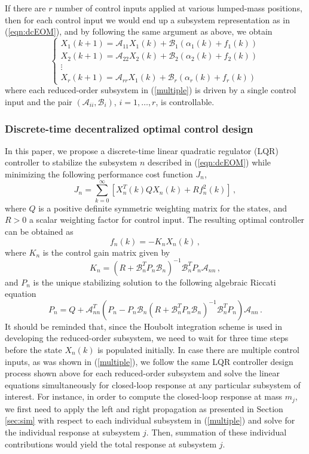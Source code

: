 \documentclass[11pt]{ucthesis}
\newcommand{\beq}{\begin{equation}}
\newcommand{\eeq}{\end{equation}}
\begin{document}
If there are $r$ number of control inputs applied at various lumped-mass positions, then for each control input we would end up a subsystem representation as in (\ref{eqn:dcEOM}), and by following the same argument as above, we obtain 
\beq		\label{multiple}
\left \{
\begin{array}{l}
X_1(k+1) = \mathcal{A}_{11} X_1(k) + \mathcal{B}_1 (\alpha_1 (k) +f_{1} (k) )  \\
X_2(k+1) = \mathcal{A}_{22} X_2(k) + \mathcal{B}_2 (\alpha_2 (k) +f_{2} (k) )  \\
\vdots \\
X_r (k+1) = \mathcal{A}_{rr} X_1(k) + \mathcal{B}_r (\alpha_r (k) +f_{r} (k) ) 
\end{array}
\right .
\eeq
where each reduced-order subsystem in (\ref{multiple}) is driven by a single control input and the pair $(\mathcal{A}_{ii}, \mathcal{B}_i)$, $i = 1,\dots,r$, is controllable. 

\subsubsection{Discrete-time decentralized optimal control design}	\label{dcontrol}

In this paper, we propose a discrete-time linear quadratic regulator (LQR) controller to stabilize the subsystem $n$ described in (\ref{eqn:dcEOM}) while minimizing the following performance cost function $J_n$,
\beq		\label{lqr1}
J_n = \sum_{k=0}^{\infty} \left [ X_{n}^{T} (k) Q X_{n}(k) + R f^{2}_{n} (k) \right ]\,,
\eeq
where $Q$ is a positive definite symmetric weighting matrix for the states, and $R>0$ a scalar weighting factor for control input. The resulting optimal controller can be obtained as
\beq		\label{lqr2}
f_n (k) = - K_n X_n (k) \,,
\eeq
where $K_n$ is the control gain matrix given by
\beq		\label{lqr3}
K_n = (R+\mathcal{B}_n^{T} P_n \mathcal{B}_n)^{-1} \mathcal{B}_n^{T} P_n \mathcal{A}_{nn} \,,
\eeq
and $P_n$ is the unique stabilizing solution to the following algebraic Riccati equation
\[
P_n = Q + \mathcal{A}_{nn}^T(P_n-P_n \mathcal{B}_n (R +\mathcal{B}_n^T P_n \mathcal{B}_n)^{-1} \mathcal{B}_n^T P_n) \mathcal{A}_{nn}\,.
\]
It should be reminded that, since the Houbolt integration scheme is used in developing the reduced-order subsystem, we need to wait for three time steps before the state $X_n (k)$ is populated initially. In case there are multiple control inputs, as was shown in (\ref{multiple}), we follow the same LQR controller design process shown above for each reduced-order subsystem and solve the linear equations simultaneously for closed-loop response at any particular subsystem of interest. For instance, in order to compute the closed-loop response at mass $m_j$, we first need to apply the left and right propagation as presented in Section \ref{sec:sim} with respect to each individual subsystem in (\ref{multiple}) and solve for the individual response at subsystem $j$. Then, summation of these individual contributions would yield the total response at subsystem $j$.
\end{document}
